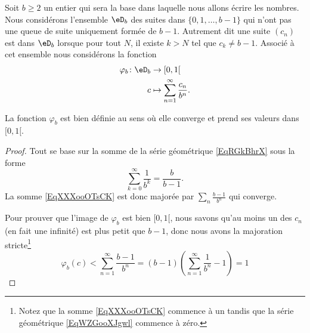 \begin{normaltext}      \label{NORMALooTZWYooPMgOIm}
    Soit \( b\geq 2\) un entier qui sera la base dans laquelle nous allons écrire les nombres. Nous considérons l'ensemble \( \eD_b\) des suites dans \( \{ 0,1,\ldots, b-1 \}\) qui n'ont pas une queue de suite uniquement formée de \( b-1\). Autrement dit une suite \( (c_n)\) est dans \( \eD_b\) lorsque pour tout \( N\), il existe \( k>N\) tel que \( c_k\neq b-1\). Associé à cet ensemble nous considérons la fonction
    \begin{equation}    \label{EqXXXooOTsCK}
        \begin{aligned}
            \varphi_b\colon \eD_b&\to \mathopen[ 0 , 1 [ \\
                c&\mapsto \sum_{n=1}^{\infty}\frac{ c_n }{ b^n }.
        \end{aligned}
    \end{equation}
\end{normaltext}

\begin{lemma}
    La fonction \( \varphi_b\) est bien définie au sens où elle converge et prend ses valeurs dans \( \mathopen[ 0 , 1 [\).
\end{lemma}

\begin{proof}
    Tout se base sur la somme de la série géométrique \eqref{EqRGkBhrX} sous la forme
    \begin{equation}    \label{EqWZGooXJgwl}
        \sum_{k=0}^{\infty}\frac{1}{ b^k }=\frac{ b }{ b-1 }.
    \end{equation}
    La somme \eqref{EqXXXooOTsCK} est donc majorée par \( \sum_n\frac{ b-1 }{ b^n }\) qui converge.

    Pour prouver que l'image de \( \varphi_b\) est bien \( \mathopen[ 0 , 1 [\), nous savons qu'au moins un des \( c_n\) (en fait une infinité) est plus petit que \( b-1\), donc nous avons la majoration stricte\footnote{Notez que la somme \eqref{EqXXXooOTsCK} commence à un tandis que la série géométrique \eqref{EqWZGooXJgwl} commence à zéro.}
        \begin{equation}
            \varphi_b(c)<\sum_{n=1}^{\infty}\frac{ b-1 }{ b^n }=(b-1)\left( \sum_{n=1}^{\infty}\frac{1}{ b^n }-1 \right)=1
        \end{equation}
\end{proof}

